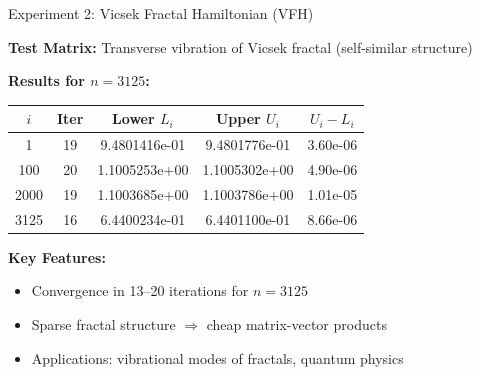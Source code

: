 \documentclass[aspectratio=169, 12pt]{beamer}
\begin{document}
\begin{frame}{Experiment 2: Vicsek Fractal Hamiltonian (VFH)}

\textbf{Test Matrix:} Transverse vibration of Vicsek fractal (self-similar structure)

\vspace{0.2cm}

\textbf{Results for \(n = 3125\):}

\begin{center}
\begin{tabular}{|c|c|c|c|c|}
\hline
\(i\) & Iter & Lower \(L_i\) & Upper \(U_i\) & \(U_i - L_i\) \\
\hline
1 & 19 & 9.4801416e-01 & 9.4801776e-01 & 3.60e-06 \\
100 & 20 & 1.1005253e+00 & 1.1005302e+00 & 4.90e-06 \\
2000 & 19 & 1.1003685e+00 & 1.1003786e+00 & 1.01e-05 \\
3125 & 16 & 6.4400234e-01 & 6.4401100e-01 & 8.66e-06 \\
\hline
\end{tabular}
\end{center}

\vspace{0.3cm}

\textbf{Key Features:}
\begin{itemize}
    \item Convergence in 13--20 iterations for \(n = 3125\)
    \item Sparse fractal structure \(\Rightarrow\) cheap matrix-vector products
    \item Applications: vibrational modes of fractals, quantum physics
\end{itemize}

\end{frame}
\end{document}
